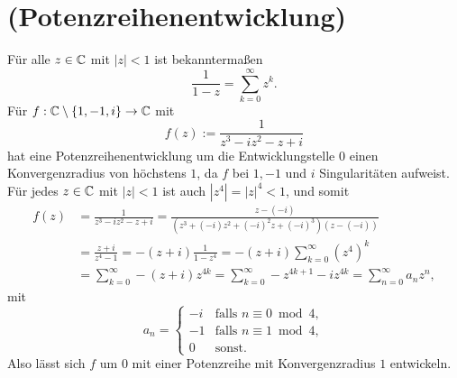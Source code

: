 \documentclass[a4paper,10pt]{article}
\begin{document}
\section{(Potenzreihenentwicklung)}
Für alle $z \in \mathbb{C}$ mit $|z| < 1$ ist bekanntermaßen
\[
 \frac{1}{1-z} = \sum_{k=0}^\infty z^k.
\]
Für $f : \mathbb{C} \setminus \{1,-1,i\} \to \mathbb{C}$ mit
\[
 f(z) := \frac{1}{z^3 - iz^2 - z + i}
\]
hat eine Potenzreihenentwicklung um die Entwicklungstelle $0$ einen Konvergenzradius von höchstens $1$, da $f$ bei $1,-1$ und $i$ Singularitäten aufweist. Für jedes $z \in \mathbb{C}$ mit $|z| < 1$ ist auch $|z^4| = |z|^4 < 1$, und somit
\begin{align*}
 f(z)
 &= \frac{1}{z^3 - iz^2 - z + i}
 = \frac{z-(-i)}{(z^3+(-i)z^2+(-i)^2z+(-i)^3)(z-(-i))} \\
 &= \frac{z+i}{z^4-1} = -(z+i)\frac{1}{1-z^4} = -(z+i) \sum_{k=0}^\infty \left(z^4\right)^k \\
 &= \sum_{k=0}^\infty -(z+i)z^{4k} = \sum_{k=0}^\infty -z^{4k+1}-iz^{4k} = \sum_{n=0}^\infty a_n z^n,
\end{align*}
mit
\[
 a_n =
 \begin{cases}
  -i & \text{falls } n \equiv 0 \bmod 4, \\
  -1 & \text{falls } n \equiv 1 \bmod 4, \\
   0 & \text{sonst}.
 \end{cases}
\]
Also lässt sich $f$ um $0$ mit einer Potenzreihe mit Konvergenzradius $1$ entwickeln.
\end{document}
